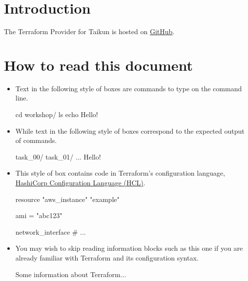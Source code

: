 \section{Introduction}

The Terraform Provider for Taikun is hosted on \href{https://github.com/itera-io/terraform-provider-taikun}{GitHub}.
\blindtext{}

\section{How to read this document}

\begin{itemize}
  \item Text in the following style of boxes are commands to type on the command line.
\begin{shell}
cd workshop/
ls
echo Hello!
\end{shell}
\item While text in the following style of boxes correspond to the expected output of commands.
\begin{raw}
task_00/
task_01/
...
Hello!
\end{raw}
\item This style of box contains code in Terraform's configuration language,
\href{https://www.terraform.io/docs/language/syntax/configuration.html}{HashiCorp Configuration Language (HCL)}.
\begin{tf}
resource "aws_instance" "example" {
  ami = "abc123"

  network_interface {
    # ...
  }
}
\end{tf}
\item You may wish to skip reading information blocks such as this one if you are already familiar with
Terraform and its configuration syntax.
\begin{tip}
  Some information about Terraform...
\end{tip}
\end{itemize}

